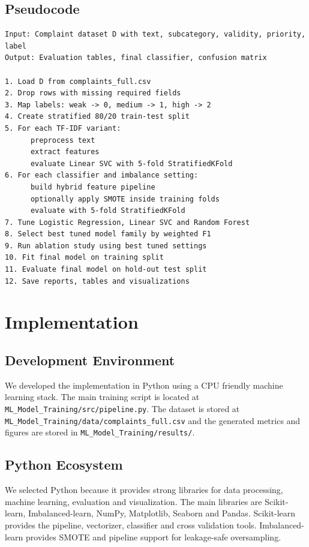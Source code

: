 \documentclass[12pt,a4paper,openany]{book}
\begin{document}
\section{Pseudocode}
\begin{lstlisting}[caption={Pseudocode for the experimental pipeline},label={lst:pseudocode}]
Input: Complaint dataset D with text, subcategory, validity, priority, label
Output: Evaluation tables, final classifier, confusion matrix

1. Load D from complaints_full.csv
2. Drop rows with missing required fields
3. Map labels: weak -> 0, medium -> 1, high -> 2
4. Create stratified 80/20 train-test split
5. For each TF-IDF variant:
      preprocess text
      extract features
      evaluate Linear SVC with 5-fold StratifiedKFold
6. For each classifier and imbalance setting:
      build hybrid feature pipeline
      optionally apply SMOTE inside training folds
      evaluate with 5-fold StratifiedKFold
7. Tune Logistic Regression, Linear SVC and Random Forest
8. Select best tuned model family by weighted F1
9. Run ablation study using best tuned settings
10. Fit final model on training split
11. Evaluate final model on hold-out test split
12. Save reports, tables and visualizations
\end{lstlisting}

\chapter{Implementation}

\section{Development Environment}
We developed the implementation in Python using a CPU friendly machine learning stack. The main training script is located at \texttt{ML\_Model\_Training/src/pipeline.py}. The dataset is stored at \texttt{ML\_Model\_Training/data/complaints\_full.csv} and the generated metrics and figures are stored in \texttt{ML\_Model\_Training/results/}.

\section{Python Ecosystem}
We selected Python because it provides strong libraries for data processing, machine learning, evaluation and visualization. The main libraries are Scikit-learn, Imbalanced-learn, NumPy, Matplotlib, Seaborn and Pandas. Scikit-learn provides the pipeline, vectorizer, classifier and cross validation tools. Imbalanced-learn provides SMOTE and pipeline support for leakage-safe oversampling.
\end{document}
